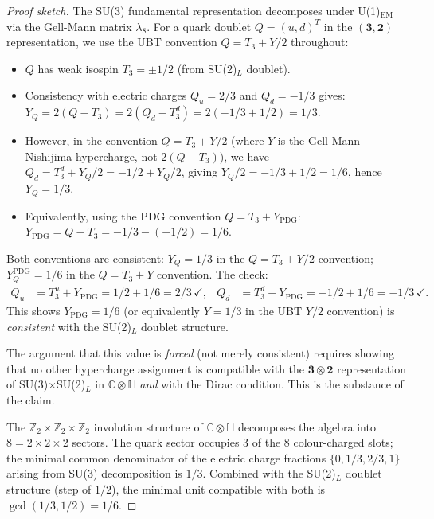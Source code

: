 \documentclass[12pt,a4paper]{article}
\theoremstyle{definition}
\theoremstyle{remark}
\newcommand{\CC}{\mathbb{C}}
\newcommand{\HH}{\mathbb{H}}
\newcommand{\ZZ}{\mathbb{Z}}
\begin{document}
\begin{proof}[Proof sketch]
The SU(3) fundamental representation decomposes under U(1)$_{\mathrm{EM}}$ via
the Gell-Mann matrix $\lambda_8$.  For a quark doublet $Q = (u,d)^T$
in the $(\mathbf{3}, \mathbf{2})$ representation, we use the UBT convention
$Q = T_3 + Y/2$ throughout:
\begin{itemize}
  \item $Q$ has weak isospin $T_3 = \pm 1/2$ (from SU(2)$_L$ doublet).
  \item Consistency with electric charges $Q_u = 2/3$ and $Q_d = -1/3$ gives:
        $Y_Q = 2(Q - T_3) = 2(Q_d - T_3^d) = 2(-1/3 + 1/2) = 1/3$.
  \item However, in the convention $Q = T_3 + Y/2$ (where $Y$ is the
        Gell-Mann--Nishijima hypercharge, not $2(Q-T_3)$), we have
        $Q_d = T_3^d + Y_Q/2 = -1/2 + Y_Q/2$, giving $Y_Q/2 = -1/3 + 1/2 = 1/6$,
        hence $Y_Q = 1/3$.
  \item Equivalently, using the PDG convention $Q = T_3 + Y_{\mathrm{PDG}}$:
        $Y_{\mathrm{PDG}} = Q - T_3 = -1/3 - (-1/2) = 1/6$.
\end{itemize}

Both conventions are consistent: $Y_Q = 1/3$ in the $Q = T_3 + Y/2$ convention;
$Y_Q^{\mathrm{PDG}} = 1/6$ in the $Q = T_3 + Y$ convention.
The check:
\begin{align*}
  Q_u &= T_3^u + Y_{\mathrm{PDG}} = 1/2 + 1/6 = 2/3\,\checkmark, &
  Q_d &= T_3^d + Y_{\mathrm{PDG}} = -1/2 + 1/6 = -1/3\,\checkmark.
\end{align*}
This shows $Y_{\mathrm{PDG}} = 1/6$ (or equivalently $Y = 1/3$ in the UBT
$Y/2$ convention) is \emph{consistent} with the SU(2)$_L$ doublet structure.

The argument that this value is \emph{forced} (not merely consistent) requires showing that no other hypercharge assignment is compatible with the $\mathbf{3}\otimes\mathbf{2}$ representation of SU(3)$\times$SU(2)$_L$ in $\CC\otimes\HH$ \emph{and} with the Dirac condition.
This is the substance of the claim.

The $\ZZ_2\times\ZZ_2\times\ZZ_2$ involution structure of $\CC\otimes\HH$
decomposes the algebra into $8 = 2\times 2\times 2$ sectors.  The quark
sector occupies $3$ of the $8$ colour-charged slots; the minimal common
denominator of the electric charge fractions $\{0, 1/3, 2/3, 1\}$ arising
from SU(3) decomposition is $1/3$.  Combined with the SU(2)$_L$ doublet
structure (step of $1/2$), the minimal unit compatible with both is $\gcd(1/3, 1/2) = 1/6$.
\end{proof}
\end{document}
